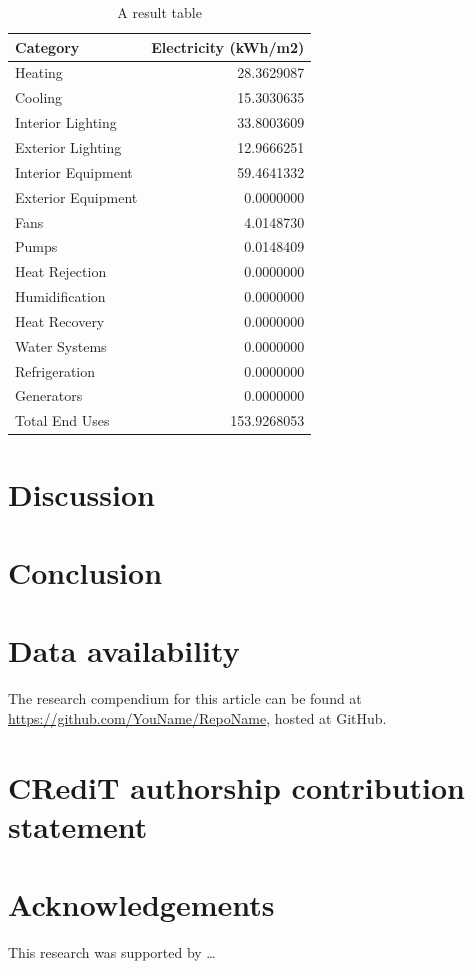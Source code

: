 \documentclass[]{elsarticle} %
\begin{document}
\begin{table}[htbp]

\caption{\label{tab:table}A result table}
\centering
\begin{tabular}[t]{lr}
\toprule
Category & Electricity (kWh/m2)\\
\midrule
Heating & 28.3629087\\
Cooling & 15.3030635\\
Interior Lighting & 33.8003609\\
Exterior Lighting & 12.9666251\\
Interior Equipment & 59.4641332\\
Exterior Equipment & 0.0000000\\
Fans & 4.0148730\\
Pumps & 0.0148409\\
Heat Rejection & 0.0000000\\
Humidification & 0.0000000\\
Heat Recovery & 0.0000000\\
Water Systems & 0.0000000\\
Refrigeration & 0.0000000\\
Generators & 0.0000000\\
Total End Uses & 153.9268053\\
\bottomrule
\end{tabular}
\end{table}

\hypertarget{discussion}{%
\section{Discussion}\label{discussion}}

\hypertarget{conclusion}{%
\section{Conclusion}\label{conclusion}}

\hypertarget{data-availability}{%
\section*{Data availability}\label{data-availability}}

The research compendium for this article can be found at
\url{https://github.com/YouName/RepoName}, hosted at GitHub.

\hypertarget{credit-authorship-contribution-statement}{%
\section*{CRediT authorship contribution statement}\label{credit-authorship-contribution-statement}}

\hypertarget{acknowledgements}{%
\section*{Acknowledgements}\label{acknowledgements}}

This research was supported by \ldots{}

\renewcommand\refname{References}

\end{document}

